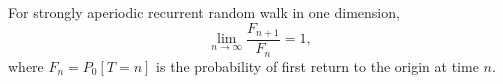 For strongly aperiodic recurrent random walk in one dimension,
$$\lim_{n \to \infty} \frac{F_{n+1}}{F_n} = 1,$$
where $F_n = P_0[T = n]$ is the probability of first return to the origin at time $n$.
